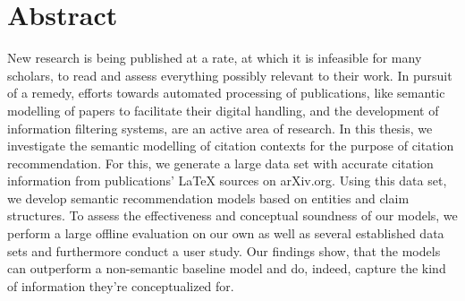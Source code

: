 \chapter*{Abstract}
New research is being published at a rate, at which it is %
infeasible for many scholars, to read and assess everything possibly %
relevant to their work. %
In pursuit of a remedy, efforts towards automated processing of publications, like semantic modelling of papers to facilitate their digital handling, and the development of information filtering systems, are an active area of research. %
In this thesis, we investigate the semantic modelling of citation contexts for the purpose of citation recommendation. For this, we generate a large data set with accurate citation information from publications' \LaTeX{} sources on arXiv.org. Using this data set, we develop semantic recommendation models based on entities and claim structures. To assess the effectiveness and conceptual soundness of our models, we perform a large offline evaluation on our own as well as several established data sets and furthermore conduct a user study. Our findings show, that the models can outperform a non-semantic baseline model and do, indeed, capture the kind of information they're conceptualized for.


